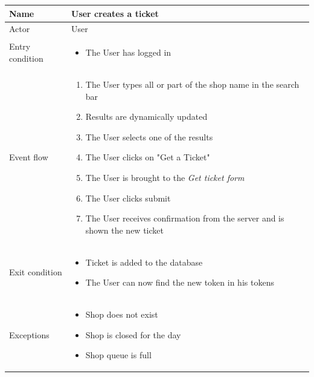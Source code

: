 \begin{table}[H]
    \begin{tabu} to \textwidth {|X|X[4]|}
        \hline
        Name            & User creates a ticket      \\ \hline
        Actor           & User                       \\ \hline
        Entry condition & \begin{itemize}
            \item The User has logged in
        \end{itemize} \\ \hline
        Event flow      & \begin{enumerate}
            \item The User types all or part of the shop name in the search bar
            \item Results are dynamically updated
            \item The User selects one of the results
            \item The User clicks on "Get a Ticket"
            \item The User is brought to the \emph{Get ticket form}
            \item The User clicks submit
            \item The User receives confirmation from the server and is shown the new ticket
        \end{enumerate} \\ \hline
        Exit condition  & \begin{itemize}
            \item Ticket is added to the database
            \item The User can now find the new token in his tokens
        \end{itemize} \\ \hline
        Exceptions      & \begin{itemize}
            \item Shop does not exist
            \item Shop is closed for the day
            \item Shop queue is full
        \end{itemize} \\ \hline
    \end{tabu}
\end{table}

